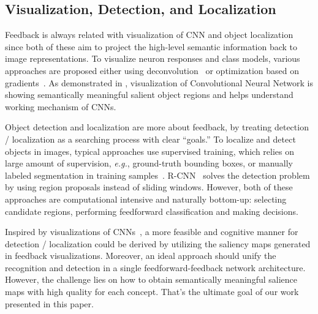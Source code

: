 \subsection{Visualization, Detection, and Localization}

Feedback is always related with visualization of CNN and object localization since both of these aim to project the high-level semantic information back to image representations. To visualize neuron responses and class models, various approaches are proposed either using deconvolution~\cite{zeiler2014visualizing} or optimization based on gradients~\cite{simonyan2013deep, le2013building}. As demonstrated in \cite{simonyan2013deep}, visualization of Convolutional Neural Network is showing semantically meaningful salient object regions and helps understand working mechanism of CNNs.

Object detection and localization are more about feedback, by treating detection / localization as a searching process with clear ``goals.'' To localize and detect objects in images, typical approaches use supervised training, which relies on large amount of supervision, \emph{e.g.}, ground-truth bounding boxes, or manually labeled segmentation in training samples~\cite{erhan2014scalable}. R-CNN~\cite{girshick2014rich} solves the detection problem by using region proposals instead of sliding windows. However, both of these approaches are computational intensive and naturally bottom-up: selecting candidate regions, performing feedforward classification and making decisions.

Inspired by visualizations of CNNs~\cite{zeiler2014visualizing,simonyan2013deep}, a more feasible and cognitive manner for detection / localization could be derived by utilizing the saliency maps generated in feedback visualizations. Moreover, an ideal approach should unify the recognition and detection in a single feedforward-feedback network architecture. However, the challenge lies on how to obtain semantically meaningful salience maps with high quality for each concept. That's the ultimate goal of our work presented in this paper.
